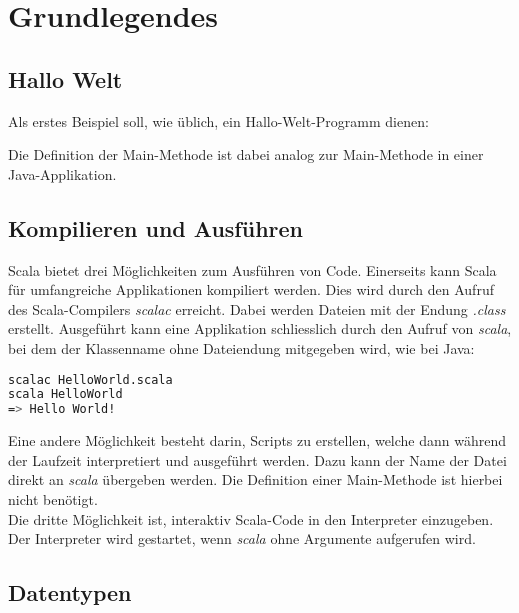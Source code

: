 \chapter{Grundlegendes}

\section{Hallo Welt}
\label{sec:helloWorld}

Als erstes Beispiel soll, wie üblich, ein Hallo-Welt-Programm dienen:



Die Definition der Main-Methode ist dabei analog zur Main-Methode in
einer Java-Applikation.


\section{Kompilieren und Ausführen}

Scala bietet drei Möglichkeiten zum Ausführen von Code. Einerseits kann Scala
für umfangreiche Applikationen kompiliert werden. Dies wird durch den
Aufruf des Scala-Compilers \emph{scalac} erreicht. Dabei werden Dateien
mit der Endung \emph{.class} erstellt. Ausgeführt kann eine Applikation
schliesslich durch den Aufruf von \emph{scala}, bei dem der Klassenname 
ohne Dateiendung mitgegeben wird, wie bei Java:

\begin{lstlisting}[float=ht,language=bash,caption=Kompilieren und ausführen von Scala-Code,label=lst:execute]
scalac HelloWorld.scala
scala HelloWorld
=> Hello World!
\end{lstlisting}

Eine andere Möglichkeit besteht darin, Scripts zu erstellen, welche dann
während der Laufzeit interpretiert und ausgeführt werden. Dazu kann
der Name der Datei direkt an \emph{scala} übergeben werden. Die Definition
einer Main-Methode ist hierbei nicht benötigt.\\

Die dritte Möglichkeit ist, interaktiv Scala-Code in den Interpreter 
einzugeben. Der Interpreter wird gestartet, wenn \emph{scala} ohne
Argumente aufgerufen wird.


\section{Datentypen}
\label{sec:datatypes}

